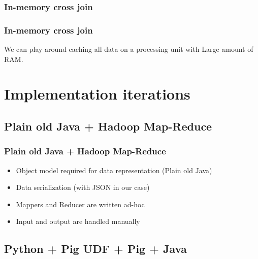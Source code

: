 \documentclass[handout]{beamer}
\begin{document}

\subsubsection{In-memory cross join}


\begin{frame}
\frametitle{\bf In-memory cross join}

We can play around caching all data on a processing unit with Large amount of RAM.

\end{frame}


\section{Implementation iterations}

\subsection{Plain old Java + Hadoop Map-Reduce}


\begin{frame}
\frametitle{\bf Plain old Java + Hadoop Map-Reduce}

\begin{itemize}
\item Object model required for data representation (Plain old Java)
\item Data serialization (with JSON in our case)
\item Mappers and Reducer are written ad-hoc
\item Input and output are handled manually
\end{itemize}

\end{frame}


\subsection{Python + Pig UDF + Pig + Java}
\end{document}
